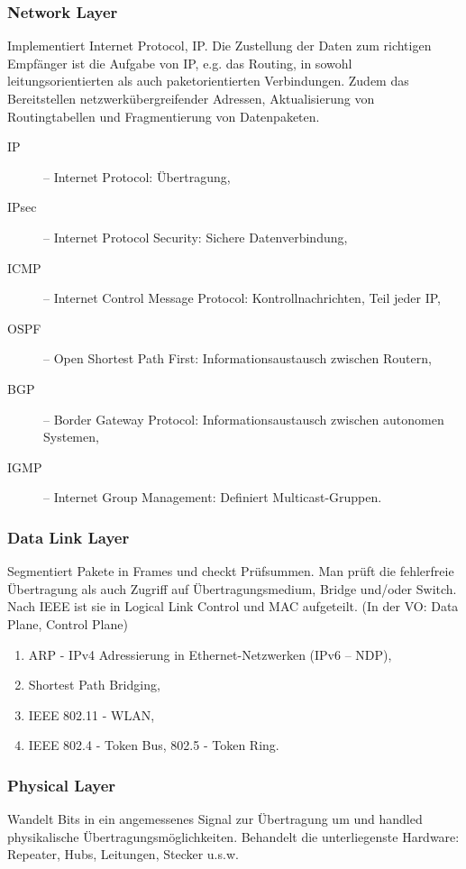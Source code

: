 \documentclass{scrartcl}
\begin{document}
    \subsubsection{Network Layer}
    \label{subsubsection:OSI_network_layer}
    Implementiert Internet Protocol, IP. Die Zustellung der Daten zum richtigen Empfänger ist die Aufgabe von IP, e.g. das Routing, in sowohl leitungsorientierten als auch paketorientierten Verbindungen. 
    Zudem das Bereitstellen netzwerkübergreifender Adressen, Aktualisierung von Routingtabellen und Fragmentierung von Datenpaketen. 
    \begin{description}
        \item [IP] -- Internet Protocol: Übertragung,
        \item [IPsec] -- Internet Protocol Security: Sichere Datenverbindung,
        \item [ICMP] -- Internet Control Message Protocol: Kontrollnachrichten, Teil jeder IP,
        \item [OSPF] -- Open Shortest Path First: Informationsaustausch zwischen Routern,
        \item [BGP] -- Border Gateway Protocol: Informationsaustausch zwischen autonomen Systemen,
        \item [IGMP] -- Internet Group Management: Definiert Multicast-Gruppen.
    \end{description}

    \subsubsection{Data Link Layer}
    \label{subsubsection:OSI_data_link_layer}
    Segmentiert Pakete in Frames und checkt Prüfsummen. Man prüft die fehlerfreie Übertragung als auch Zugriff auf Übertragungsmedium, Bridge und/oder Switch. Nach IEEE ist sie in Logical Link Control und MAC aufgeteilt. (In der VO: Data Plane, Control Plane)
    \begin{enumerate}
        \item ARP - IPv4 Adressierung in Ethernet-Netzwerken (IPv6 -- NDP),
        \item Shortest Path Bridging,
        \item IEEE 802.11 - WLAN,
        \item IEEE 802.4 - Token Bus, 802.5 - Token Ring.
    \end{enumerate}

    \subsubsection{Physical Layer}
    \label{subsubsection:OSI_physical_layer}
    Wandelt Bits in ein angemessenes Signal zur Übertragung um und handled physikalische Übertragungsmöglichkeiten. Behandelt die unterliegenste Hardware: Repeater, Hubs, Leitungen, Stecker u.s.w.
    
\end{document}
